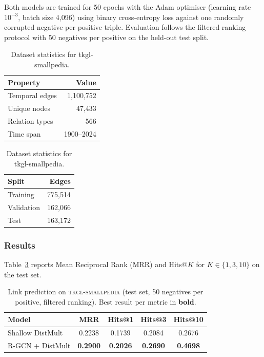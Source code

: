 \documentclass[11pt]{article}
\theoremstyle{definition}
\begin{document}
Both models are trained for 50 epochs with the Adam optimiser
(learning rate $10^{-3}$, batch size 4{,}096) using binary
cross-entropy loss against one randomly corrupted negative per
positive triple.  Evaluation follows the filtered ranking protocol
with 50 negatives per positive on the held-out test split.
\begin{table}[H]
\centering
\begin{minipage}{0.45\linewidth}
\centering
\begin{tabular}{lr}
\toprule
Property & Value \\
\midrule
Temporal edges  & 1,100,752  \\
Unique nodes    & 47,433     \\
Relation types  & 566        \\
Time span       & 1900--2024 \\
\bottomrule
\end{tabular}
\end{minipage}
\hfill
\begin{minipage}{0.45\linewidth}
\centering
\begin{tabular}{lr}
\toprule
Split      & Edges   \\
\midrule
Training   & 775,514 \\
Validation & 162,066 \\
Test       & 163,172 \\
\bottomrule
\end{tabular}
\end{minipage}
\caption{Dataset statistics for tkgl-smallpedia.}
\label{tab:wiki_stats}
\end{table}
\subsubsection{Results}
\label{subsubsec:wikidata-results}

Table~\ref{tab:wikidata} reports Mean Reciprocal Rank (MRR) and
Hits@$K$ for $K \in \{1, 3, 10\}$ on the test set.

\begin{table}[H]
\centering
\begin{tabular}{lcccc}
\toprule
Model               & MRR    & Hits@1 & Hits@3 & Hits@10 \\
\midrule
Shallow DistMult    & 0.2238 & 0.1739 & 0.2084 & 0.2676 \\
R-GCN + DistMult    & \textbf{0.2900} & \textbf{0.2026} 
                    & \textbf{0.2690} & \textbf{0.4698} \\
                    
\bottomrule
\end{tabular}
\caption{Link prediction on \textsc{tkgl-smallpedia} (test set,
         50 negatives per positive, filtered ranking).
         Best result per metric in \textbf{bold}.}
\label{tab:wikidata}
\end{table}
\end{document}
